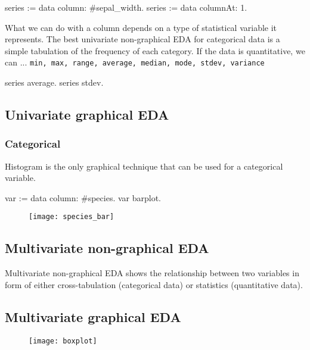 \documentclass{article}
\begin{document}
\begin{multicols}{2}
\begin{code}{}
series := data column: #sepal_width.
series := data columnAt: 1.
\end{code}

What we can do with a column depends on a type of statistical variable it represents. The best univariate non-graphical EDA for categorical data is a simple tabulation of the frequency of each category\cite{Seltman}. If the data is quantitative, we can ...
\texttt{min, max, range, average, median, mode, stdev, variance}

\begin{code}{}
series average. 
series stdev.
\end{code}

\subsection{Univariate graphical EDA}
\subsubsection{Categorical}

Histogram is the only graphical technique that can be used for a categorical variable.

\begin{code}{}
var := data column: #species.
var barplot.
\end{code}

\begin{figure}[H]
  \begin{center}
  \texttt{[image: species\_bar]}
  \end{center}
\end{figure}

\subsection{Multivariate non-graphical EDA}
Multivariate non-graphical EDA shows the relationship between two variables in form of either cross-tabulation (categorical data) or statistics (quantitative data).

\subsection{Multivariate graphical EDA}
\begin{figure}[H]
  \begin{center}
  \texttt{[image: boxplot]}
  \end{center}
\end{figure}


\end{multicols}
\end{document}
